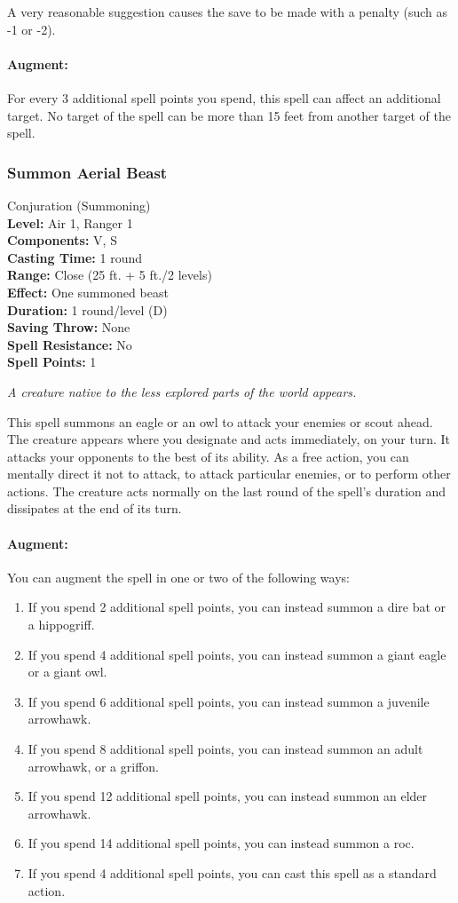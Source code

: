 A very reasonable suggestion causes the save to be made with a penalty (such as -1 or -2).

\paragraph{Augment:}
For every 3 additional spell points you spend, this spell can affect an additional target.%
No target of the spell can be more than 15 feet from another target of the spell.
\subsubsection{Summon Aerial Beast}
\label{Spell:SummonAerialBeast}
Conjuration (Summoning)
\\ \textbf{Level:} Air 1, Ranger 1
\\ \textbf{Components:} V, S
\\ \textbf{Casting Time:} 1 round
\\ \textbf{Range:} Close (25 ft. + 5 ft./2 levels)
\\ \textbf{Effect:} One summoned beast
\\ \textbf{Duration:} 1 round/level (D)
\\ \textbf{Saving Throw:} None
\\ \textbf{Spell Resistance:} No
\\ \textbf{Spell Points:} 1

\emph{A creature native to the less explored parts of the world appears.}

This spell summons an eagle or an owl to attack your enemies or scout ahead.
The creature appears where you designate and acts immediately, on your turn. 
It attacks your opponents to the best of its ability. 
As a free action, you can mentally direct it not to attack, to attack particular enemies, or to perform other actions. 
The creature acts normally on the last round of the spell's duration and dissipates at the end of its turn.

\paragraph{Augment:} You can augment the spell in one or two of the following ways: 
\begin{enumerate}
 \item If you spend 2 additional spell points, you can instead summon a dire bat or a hippogriff.
 \item If you spend 4 additional spell points, you can instead summon a giant eagle or a giant owl.
 \item If you spend 6 additional spell points, you can instead summon a juvenile arrowhawk.
 \item If you spend 8 additional spell points, you can instead summon an adult arrowhawk, or a griffon.
 \item If you spend 12 additional spell points, you can instead summon an elder arrowhawk.
 \item If you spend 14 additional spell points, you can instead summon a roc.
 \item If you spend 4 additional spell points, you can cast this spell as a standard action.
\end{enumerate}
